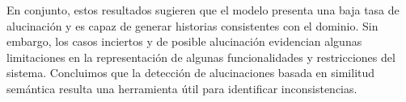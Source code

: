 En conjunto, estos resultados sugieren que el modelo presenta una baja tasa de alucinación y es capaz de generar historias consistentes con el dominio. Sin embargo, los casos inciertos y de posible alucinación evidencian algunas limitaciones en la representación de algunas funcionalidades y restricciones del sistema. Concluimos que la detección de alucinaciones basada en similitud semántica resulta una herramienta útil para identificar inconsistencias.%









